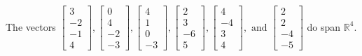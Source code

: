\begin{exercise}
\begin{exerciseStatement}
  \end{exerciseStatement}
  \begin{exerciseAnswer}
   The vectors \(\left[\begin{array}{r}
3 \\
-2 \\
-1 \\
4
\end{array}\right] , \left[\begin{array}{r}
0 \\
4 \\
-2 \\
-3
\end{array}\right] , \left[\begin{array}{r}
4 \\
1 \\
0 \\
-3
\end{array}\right] , \left[\begin{array}{r}
2 \\
3 \\
-6 \\
5
\end{array}\right] , \left[\begin{array}{r}
4 \\
-4 \\
3 \\
4
\end{array}\right] , \text{ and } \left[\begin{array}{r}
2 \\
2 \\
-4 \\
-5
\end{array}\right]\) 
  	 do  
	span \(\mathbb{R}^4\).
  


  \end{exerciseAnswer}
\end{exercise}